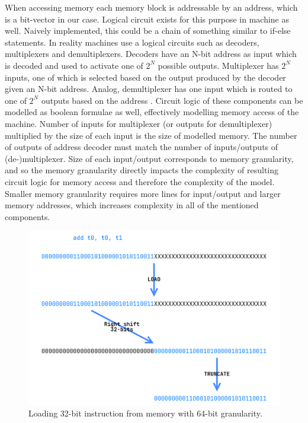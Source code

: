 \documentclass[12pt]{article}
\begin{document}
When accessing memory each memory block is addressable by an address, which is
a bit-vector in our case. Logical circuit exists for this purpose in machine as
well. Naively implemented, this could be a chain of something similar to
if-else statements. In reality machines use a logical circuits such as
decoders, multiplexers and demultiplexers. Decoders have an N-bit address as
input which is decoded and used to activate one of $2^N$ possible outputs.
Multiplexer has $2^N$ inputs, one of which is selected based on the output
produced by the decoder given an N-bit address. Analog, demultiplexer has one
input which is routed to one of $2^N$ outputs based on the address
\cite{horowitz1989art}. Circuit logic of these components can be modelled as
boolean formulae as well, effectively modelling memory access of the machine.
Number of inputs for multiplexer (or outputs for demultiplexer) multiplied by
the size of each input is the size of modelled memory. The number of outputs of
address decoder must match the number of inputs/outputs of (de-)multiplexer.
Size of each input/output corresponds to memory granularity, and so the memory
granularity directly impacts the complexity of resulting circuit logic for
memory access and therefore the complexity of the model. Smaller memory
granularity requires more lines for input/output and larger memory addresses,
which increases complexity in all of the mentioned components.

\begin{figure}[h]
    \includegraphics[width=0.95\linewidth]{assets/64_bit_instruction_load.png}
    \centering
    \caption{Loading 32-bit instruction \cite{waterman2014risc} from memory with 64-bit granularity.}
    \label{fig:instruction_load_example}
\end{figure}
\end{document}
